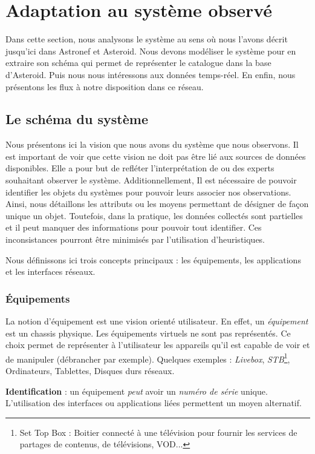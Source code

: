 \section{Adaptation au système observé}\label{sec:valid:domvision:systeme}
Dans cette section, nous analysons le système au sens où nous l'avons décrit jusqu'ici dans Astronef et Asteroid. Nous devons modéliser le système pour en extraire son schéma qui permet de représenter le catalogue dans la base d'Asteroid. Puis nous nous intéressons aux données temps-réel. En enfin, nous présentons les flux à notre disposition dans ce réseau.

\subsection{Le schéma du système}
Nous présentons ici la vision que nous avons du système que nous observons. Il est important de voir que cette vision ne doit pas être lié aux sources de données disponibles. Elle a pour but de refléter l'interprétation de ou des experts souhaitant observer le système. Additionnellement, Il est nécessaire de pouvoir identifier les objets du systèmes pour pouvoir leurs associer nos observations. Ainsi, nous détaillons les attributs ou les moyens permettant de désigner de façon unique un objet. Toutefois, dans la pratique, les données collectés sont partielles et il peut manquer des informations pour pouvoir tout identifier. Ces inconsistances pourront être minimisés par l'utilisation d'heuristiques.

Nous définissons ici trois concepts principaux : les équipements, les applications et les interfaces réseaux.

\subsubsection{Équipements}
La notion d'équipement est une vision orienté utilisateur. En effet, un \textit{équipement} est un chassis physique. Les équipements virtuels ne sont pas représentés. Ce choix permet de représenter à l'utilisateur les appareils qu'il est capable de voir et de manipuler (débrancher par exemple). Quelques exemples : \textit{Livebox}, \textit{STB}\footnote{Set Top Box : Boitier connecté à une télévision pour fournir les services de partages de contenus, de télévisions, VOD...}, Ordinateurs, Tablettes, Disques durs réseaux.

\textbf{Identification} : un équipement \textit{peut} avoir un \textit{numéro de série} unique. L'utilisation des interfaces ou applications liées permettent un moyen alternatif.

